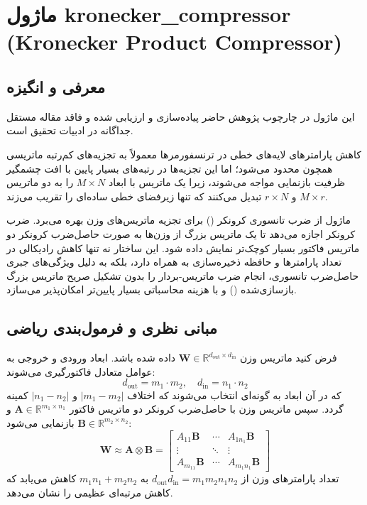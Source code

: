 \section{ماژول kronecker\_compressor (Kronecker Product Compressor)}
\label{sec:module_kronecker_compressor}

\subsection{معرفی و انگیزه}
این ماژول در چارچوب پژوهش حاضر پیاده‌سازی و ارزیابی شده و فاقد مقاله مستقل جداگانه در ادبیات تحقیق است.

کاهش پارامترهای لایه‌های خطی در ترنسفورمرها معمولاً به تجزیه‌های کم‌رتبه ماتریسی همچون  محدود می‌شود؛ اما این تجزیه‌ها در رتبه‌های بسیار پایین با افت چشمگیر ظرفیت بازنمایی مواجه می‌شوند، زیرا یک ماتریس با ابعاد $M \times N$ را به دو ماتریس $M \times r$ و $r \times N$ تبدیل می‌کنند که تنها زیرفضای خطی ساده‌ای را تقریب می‌زند.

ماژول  از ضرب تانسوری کرونکر () برای تجزیه ماتریس‌های وزن بهره می‌برد. ضرب کرونکر اجازه می‌دهد تا یک ماتریس بزرگ از وزن‌ها به صورت حاصل‌ضرب کرونکر دو ماتریس فاکتور بسیار کوچک‌تر نمایش داده شود. این ساختار نه تنها کاهش رادیکالی در تعداد پارامترها و حافظه ذخیره‌سازی به همراه دارد، بلکه به دلیل ویژگی‌های جبری حاصل‌ضرب تانسوری، انجام ضرب ماتریس-بردار را بدون تشکیل صریح ماتریس بزرگ بازسازی‌شده () و با هزینه محاسباتی بسیار پایین‌تر امکان‌پذیر می‌سازد.

\subsection{مبانی نظری و فرمول‌بندی ریاضی}
فرض کنید ماتریس وزن $\mathbf{W} \in \mathbb{R}^{d_{\text{out}} \times d_{\text{in}}}$ داده شده باشد. ابعاد ورودی و خروجی به عوامل متعادل فاکتورگیری می‌شوند:
\begin{equation}
d_{\text{out}} = m_1 \cdot m_2, \quad d_{\text{in}} = n_1 \cdot n_2
\end{equation}
که در آن ابعاد به گونه‌ای انتخاب می‌شوند که اختلاف $|m_1 - m_2|$ و $|n_1 - n_2|$ کمینه گردد. سپس ماتریس وزن با حاصل‌ضرب کرونکر دو ماتریس فاکتور $\mathbf{A} \in \mathbb{R}^{m_1 \times n_1}$ و $\mathbf{B} \in \mathbb{R}^{m_2 \times n_2}$ بازنمایی می‌شود:
\begin{equation}
\mathbf{W} \approx \mathbf{A} \otimes \mathbf{B} = \begin{bmatrix} 
A_{11}\mathbf{B} & \cdots & A_{1n_1}\mathbf{B} \\ 
\vdots & \ddots & \vdots \\ 
A_{m_11}\mathbf{B} & \cdots & A_{m_1n_1}\mathbf{B} 
\end{bmatrix}
\end{equation}
تعداد پارامترهای وزن از $d_{\text{out}} d_{\text{in}} = m_1 m_2 n_1 n_2$ به $m_1 n_1 + m_2 n_2$ کاهش می‌یابد که کاهش مرتبه‌ای عظیمی را نشان می‌دهد.

